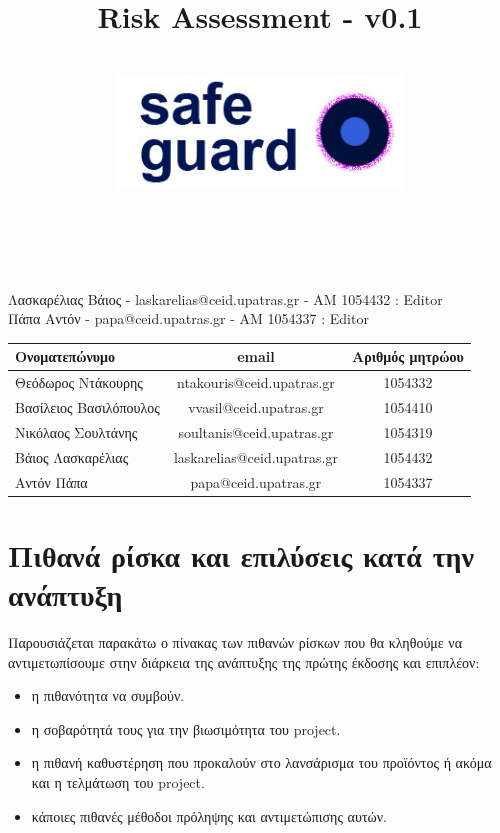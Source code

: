 \documentclass{article}
\title{Risk Assessment - v0.1}
\author{\\
\includegraphics[width=3in]{safeguard}\\[1ex]\\\\
}
\begin{document}
\maketitle
\newpage

\begin{center}
Λασκαρέλιας Βάιος - laskarelias@ceid.upatras.gr - ΑΜ 1054432 : Editor \\
Πάπα Αντόν - papa@ceid.upatras.gr - ΑΜ 1054337 : Editor
\end{center}

\begin{center}
\begin{tabular}{|l|c|c|}
\hline
Ονοματεπώνυμο & email & Αριθμός μητρώου \\
\hline
Θεόδωρος Ντάκουρης & ntakouris@ceid.upatras.gr & 1054332 \\
Βασίλειος Βασιλόπουλος & vvasil@ceid.upatras.gr &  1054410\\
Νικόλαος Σουλτάνης & soultanis@ceid.upatras.gr & 1054319  \\
Βάιος Λασκαρέλιας & laskarelias@ceid.upatras.gr & 1054432 \\
Αντόν Πάπα & papa@ceid.upatras.gr & 1054337 \\
\hline
\end{tabular}
\end{center}

\renewcommand{\contentsname}{Περιεχόμενα}

\tableofcontents
\newpage

\thispagestyle{plain} %
\mbox{}
\newpage

\section{Πιθανά ρίσκα και επιλύσεις κατά την ανάπτυξη}
Παρουσιάζεται παρακάτω ο πίνακας των πιθανών ρίσκων που θα κληθούμε να αντιμετωπίσουμε στην διάρκεια της ανάπτυξης της πρώτης έκδοσης και επιπλέον:
\begin{itemize}
\item η πιθανότητα να συμβούν.
\item η σοβαρότητά τους για την βιωσιμότητα του project.
\item η πιθανή καθυστέρηση που προκαλούν στο λανσάρισμα του προϊόντος ή ακόμα και η τελμάτωση του project. 
\item κάποιες πιθανές μέθοδοι πρόληψης και αντιμετώπισης αυτών.
\end{itemize}
\end{document}
